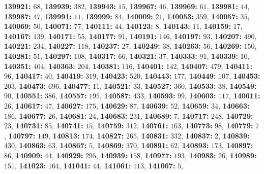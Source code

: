 \textsf{\bfseries 139921:} $68$, \textsf{\bfseries 139939:} $382$, \textsf{\bfseries 139943:} $15$, \textsf{\bfseries 139967:} $46$, \textsf{\bfseries 139969:} $61$, \textsf{\bfseries 139981:} $44$, \textsf{\bfseries 139987:} $47$, \textsf{\bfseries 139991:} $11$, \textsf{\bfseries 139999:} $84$, \textsf{\bfseries 140009:} $21$, \textsf{\bfseries 140053:} $359$, \textsf{\bfseries 140057:} $35$, \textsf{\bfseries 140069:} $50$, \textsf{\bfseries 140071:} $77$, \textsf{\bfseries 140111:} $44$, \textsf{\bfseries 140123:} $8$, \textsf{\bfseries 140143:} $11$, \textsf{\bfseries 140159:} $17$, \textsf{\bfseries 140167:} $139$, \textsf{\bfseries 140171:} $55$, \textsf{\bfseries 140177:} $91$, \textsf{\bfseries 140191:} $146$, \textsf{\bfseries 140197:} $93$, \textsf{\bfseries 140207:} $490$, \textsf{\bfseries 140221:} $234$, \textsf{\bfseries 140227:} $118$, \textsf{\bfseries 140237:} $27$, \textsf{\bfseries 140249:} $38$, \textsf{\bfseries 140263:} $56$, \textsf{\bfseries 140269:} $150$, \textsf{\bfseries 140281:} $51$, \textsf{\bfseries 140297:} $108$, \textsf{\bfseries 140317:} $66$, \textsf{\bfseries 140321:} $37$, \textsf{\bfseries 140333:} $91$, \textsf{\bfseries 140339:} $10$, \textsf{\bfseries 140351:} $404$, \textsf{\bfseries 140363:} $204$, \textsf{\bfseries 140381:} $116$, \textsf{\bfseries 140401:} $142$, \textsf{\bfseries 140407:} $479$, \textsf{\bfseries 140411:} $96$, \textsf{\bfseries 140417:} $40$, \textsf{\bfseries 140419:} $319$, \textsf{\bfseries 140423:} $520$, \textsf{\bfseries 140443:} $177$, \textsf{\bfseries 140449:} $107$, \textsf{\bfseries 140453:} $203$, \textsf{\bfseries 140473:} $696$, \textsf{\bfseries 140477:} $11$, \textsf{\bfseries 140521:} $33$, \textsf{\bfseries 140527:} $360$, \textsf{\bfseries 140533:} $38$, \textsf{\bfseries 140549:} $90$, \textsf{\bfseries 140551:} $386$, \textsf{\bfseries 140557:} $195$, \textsf{\bfseries 140587:} $433$, \textsf{\bfseries 140593:} $99$, \textsf{\bfseries 140603:} $117$, \textsf{\bfseries 140611:} $26$, \textsf{\bfseries 140617:} $47$, \textsf{\bfseries 140627:} $175$, \textsf{\bfseries 140629:} $87$, \textsf{\bfseries 140639:} $52$, \textsf{\bfseries 140659:} $34$, \textsf{\bfseries 140663:} $186$, \textsf{\bfseries 140677:} $26$, \textsf{\bfseries 140681:} $24$, \textsf{\bfseries 140683:} $231$, \textsf{\bfseries 140689:} $7$, \textsf{\bfseries 140717:} $248$, \textsf{\bfseries 140729:} $23$, \textsf{\bfseries 140731:} $85$, \textsf{\bfseries 140741:} $15$, \textsf{\bfseries 140759:} $312$, \textsf{\bfseries 140761:} $163$, \textsf{\bfseries 140773:} $98$, \textsf{\bfseries 140779:} $7$, \textsf{\bfseries 140797:} $149$, \textsf{\bfseries 140813:} $174$, \textsf{\bfseries 140827:} $265$, \textsf{\bfseries 140831:} $332$, \textsf{\bfseries 140837:} $2$, \textsf{\bfseries 140839:} $430$, \textsf{\bfseries 140863:} $63$, \textsf{\bfseries 140867:} $5$, \textsf{\bfseries 140869:} $370$, \textsf{\bfseries 140891:} $62$, \textsf{\bfseries 140893:} $173$, \textsf{\bfseries 140897:} $86$, \textsf{\bfseries 140909:} $44$, \textsf{\bfseries 140929:} $295$, \textsf{\bfseries 140939:} $158$, \textsf{\bfseries 140977:} $193$, \textsf{\bfseries 140983:} $26$, \textsf{\bfseries 140989:} $151$, \textsf{\bfseries 141023:} $164$, \textsf{\bfseries 141041:} $44$, \textsf{\bfseries 141061:} $113$, \textsf{\bfseries 141067:} $5$, 
